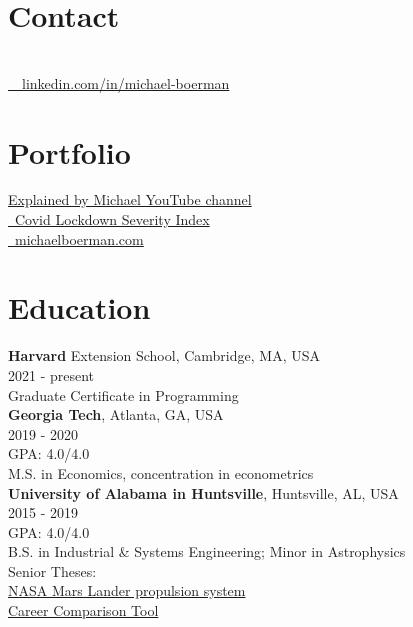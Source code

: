 \documentclass[margin,line]{res}
\begin{document}

\begin{resume}
\section{\sc Contact}
\vspace{.05in}

 \\
\faLinkedinIn  \href{https://wwwlinkedin.com/in/michael-boerman}{\ttfamily \, \, linkedin.com/in/michael-boerman}\\

\section{\sc Portfolio}
 \href{https://www.youtube.com/channel/UCxFMrMb6PrS7SOrQi-BfMUw/videos?view=0&sort=p&flow=grid}{ Explained by Michael YouTube channel}\\
\faChartLine \href{https://github.com/michaelboerman/lockdown_severity_index#readme}{\, Covid Lockdown Severity Index}\\
\faMediumM \href{https://michaelboerman.com/}{\ttfamily  \, michaelboerman.com}\\


\section{\sc Education}
{\bf Harvard} Extension School, Cambridge, MA, USA\\
2021 - present\\
Graduate Certificate in Programming\\

{\bf Georgia Tech}, Atlanta, GA, USA\\
2019 - 2020\\
GPA: 4.0/4.0\\
M.S. in Economics, concentration in econometrics\\

{\bf University of Alabama in Huntsville}, Huntsville, AL, USA\\
2015 - 2019\\
GPA: 4.0/4.0\\
B.S. in Industrial \& Systems Engineering; Minor in Astrophysics\\
Senior Theses: \\
\hspace{5mm}{\it -- Systems Engineering:} \href{https://tinyurl.com/ISEEM-SD}{NASA Mars Lander propulsion system}\\
\hspace{5mm}{\it -- Economic Decision Analysis:} \href{http://tinyurl.com/BoermanCareerChoice
}{Career Comparison Tool}


\end{resume}
\end{document}
